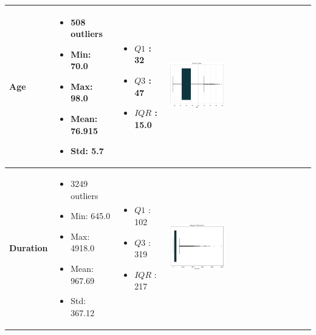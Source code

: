\documentclass{article}
\begin{document}
\begin{longtable}{|p{}|p{}|p{}|p{}|}
            \textbf{Age} & 
            \begin{itemize}
                \item 508 outliers
                \item Min: 70.0
                \item Max: 98.0
                \item Mean: 76.915
                \item Std: 5.7
            \end{itemize} & 
            \begin{itemize}
                \item $Q1$ : 32
                \item $Q3$ : 47
                \item $IQR$ : 15.0
            \end{itemize} &
            \includegraphics[width=0.40\textwidth]{data/bank_marketing/pic/Outlier/Age_Add.png} \\
            \hline
            \textbf{Duration} & 
            \begin{itemize}
                \item 3249 outliers
                \item Min: 645.0
                \item Max: 4918.0
                \item Mean: 967.69
                \item Std: 367.12
            \end{itemize} & 
            \begin{itemize}
                \item $Q1$ : 102
                \item $Q3$ : 319
                \item $IQR$ : 217
            \end{itemize} &
            \includegraphics[width=0.40\textwidth]{data/bank_marketing/pic/Outlier/Duration_Add.png} \\

\end{longtable}
\end{document}
